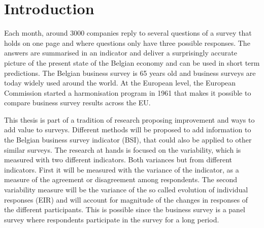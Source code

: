 \documentclass[12pt,a4paper,oneside]{book}
\begin{document}
\chapter{Introduction}

Each month, around 3000 companies reply to several questions of a survey that holds on one page and where questions only have three possible responses.
The answers are summarised in an indicator and deliver a surprisingly accurate picture of the present state of the Belgian economy and can be used in short term predictions.
The Belgian business survey is 65 years old and business surveys are today widely used around the world. 
At the European level, the European Commission started a harmonisation program in 1961 that makes it possible to compare business survey results across the EU.

This thesis is part of a tradition of research proposing improvement and ways to add value to surveys. Different methods will be proposed to add information to the Belgian business survey indicator (BSI), that could also be applied to other similar surveys.
The research at hands is focused on the variability, which is measured with two different indicators. Both variances but from different indicators.
First it will be measured with the variance of the indicator, as a measure of the agreement or disagreement among respondents.
The second variability measure will be the variance of the so called evolution of individual responses (EIR) and will account for magnitude of the changes in responses of the different participants. This is possible since the business survey is a panel survey where respondents participate in the survey for a long period.

\end{document}
